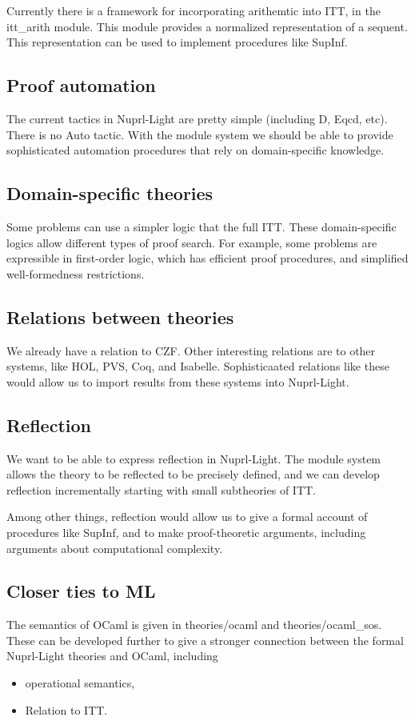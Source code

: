 \documentclass{article}
\begin{document}
Currently there is a framework for incorporating arithemtic into ITT,
in the itt\_arith module.  This module provides a normalized
representation of a sequent.  This representation can be used to
implement procedures like SupInf.

\subsection{Proof automation}
The current tactics in Nuprl-Light are pretty simple (including D,
Eqcd, etc).  There is no Auto tactic.  With the module system we should
be able to provide sophisticated automation procedures that rely on
domain-specific knowledge.

\subsection{Domain-specific theories}
Some problems can use a simpler logic that the full ITT.  These
domain-specific logics allow different types of proof search.  For
example, some problems are expressible in first-order logic, which has
efficient proof procedures, and simplified well-formedness
restrictions.

\subsection{Relations between theories}
We already have a relation to CZF.  Other interesting relations are to
other systems, like HOL, PVS, Coq, and Isabelle.  Sophisticaated
relations like these would allow us to import results from these
systems into Nuprl-Light.

\subsection{Reflection}
We want to be able to express reflection in Nuprl-Light.  The module
system allows the theory to be reflected to be precisely defined, and
we can develop reflection incrementally starting with small
subtheories of ITT.

Among other things, reflection would allow us to give a formal account
of procedures like SupInf, and to make proof-theoretic arguments,
including arguments about computational complexity.

\subsection{Closer ties to ML}
The semantics of OCaml is given in theories/ocaml and
theories/ocaml\_sos.  These can be developed further to give a stronger
connection between the formal Nuprl-Light theories and OCaml,
including
\begin{itemize}
\item
operational semantics,
\item
Relation to ITT.
\end{itemize}
\end{document}
